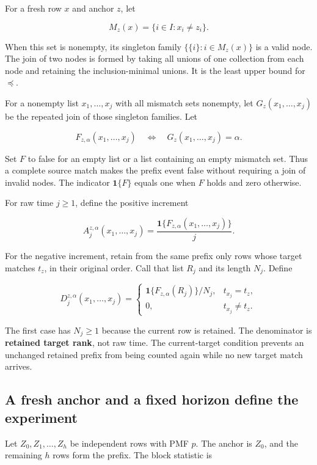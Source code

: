 \documentclass[11pt,a4paper]{article}
\newcounter{none}
\begin{document}
For a fresh row \(x\) and anchor \(z\), let

\[
M_z(x)=\{i\in I:x_i\ne z_i\}.
\]

When this set is nonempty, its singleton family \(\{\{i\}:i\in M_z(x)\}\) is a valid node. The join of two nodes is formed by taking all unions of one collection from each node and retaining the inclusion-minimal unions. It is the least upper bound for \(\preceq\).

For a nonempty list \(x_1,\ldots,x_j\) with all mismatch sets nonempty, let \(G_z(x_1,\ldots,x_j)\) be the repeated join of those singleton families. Let

\[
F_{z,\alpha}(x_1,\ldots,x_j)
\quad\Longleftrightarrow\quad
G_z(x_1,\ldots,x_j)=\alpha.
\]

Set \(F\) to false for an empty list or a list containing an empty mismatch set. Thus a complete source match makes the prefix event false without requiring a join of invalid nodes. The indicator \(\mathbf1\{F\}\) equals one when \(F\) holds and zero otherwise.

For raw time \(j\ge1\), define the positive increment

\[
A_j^{z,\alpha}(x_1,\ldots,x_j)
=\frac{\mathbf1\{F_{z,\alpha}(x_1,\ldots,x_j)\}}{j}. \tag{5}
\]

For the negative increment, retain from the same prefix only rows whose target matches \(t_z\), in their original order. Call that list \(R_j\) and its length \(N_j\). Define

\[
D_j^{z,\alpha}(x_1,\ldots,x_j)=
\begin{cases}
\mathbf1\{F_{z,\alpha}(R_j)\}/N_j,&t_{x_j}=t_z,\\
0,&t_{x_j}\ne t_z.
\end{cases} \tag{6}
\]

The first case has \(N_j\ge1\) because the current row is retained. The denominator is \textbf{retained target rank}, not raw time. The current-target condition prevents an unchanged retained prefix from being counted again while no new target match arrives.

\subsection{A fresh anchor and a fixed horizon define the experiment}\label{a-fresh-anchor-and-a-fixed-horizon-define-the-experiment}

Let \(Z_0,Z_1,\ldots,Z_h\) be independent rows with PMF \(p\). The anchor is \(Z_0\), and the remaining \(h\) rows form the prefix. The block statistic is
\end{document}
